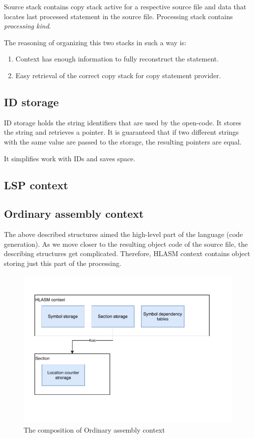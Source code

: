 Source stack contains copy stack active for a respective source file and data that locates last processed statement in the source file.
Processing stack contains \emph{processing kind}.

The reasoning of organizing this two stacks in such a way is:
\begin{enumerate}
	\item Context has enough information to fully reconstruct the statement.
	\item Easy retrieval of the correct copy stack for copy statement provider.
\end{enumerate} 

\subsection{ID storage}

ID storage holds the string identifiers that are used by the open-code. 
It stores the string and retrieves a pointer. It is guaranteed that if two different strings with the same value are passed to the storage, the resulting pointers are equal.

It simplifies work with IDs and saves space. 

\subsection{LSP context}

\subsection{Ordinary assembly context}

The above described structures aimed the high-level part of the language (code generation). As we move closer to the resulting object code of the source file, the describing structures get complicated. Therefore, HLASM context contains object storing just this part of the processing.

\begin{figure}
	\centering
	\includegraphics[width=\textwidth / 2]{img/ord_ctx_arch}
	\caption{The composition of Ordinary assembly context}
	\label{fig06:ord_ctx}
\end{figure}

